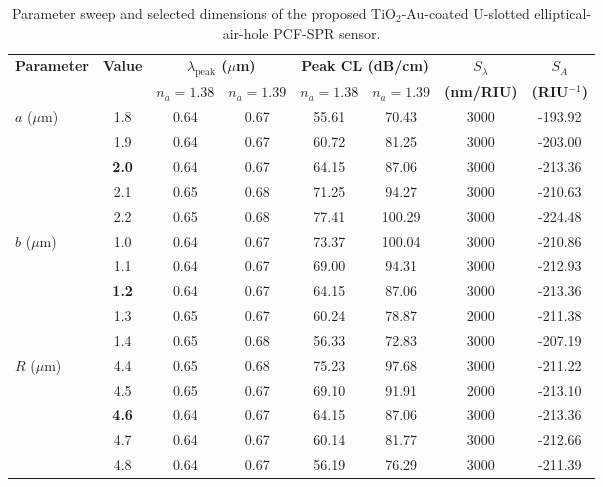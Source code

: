 \documentclass[ACS,STIX2COL]{WileyNJD-v2}
\begin{document}
\begin{table}[!t]
\centering
\caption{Parameter sweep and selected dimensions of the proposed TiO$_2$-Au-coated U-slotted elliptical-air-hole PCF-SPR sensor.}
\label{tab:optimization_results}

\renewcommand{\arraystretch}{1.25}
\setlength{\tabcolsep}{4pt}
\scriptsize
\normalfont

\begin{tabular*}{\textwidth}{@{\extracolsep{\fill}}
l c c c c c c c
@{}}

\toprule

\textbf{Parameter}
& \textbf{Value}
& \multicolumn{2}{c}{\textbf{$\lambda_{\mathrm{peak}}$ ($\mu$m)}}
& \multicolumn{2}{c}{\textbf{Peak CL (dB/cm)}}
& \textbf{$S_{\lambda}$}
& \textbf{$S_A$}
\\

\cmidrule(lr){3-4}
\cmidrule(lr){5-6}

&
& \textbf{$n_a=1.38$}
& \textbf{$n_a=1.39$}
& \textbf{$n_a=1.38$}
& \textbf{$n_a=1.39$}
& \textbf{(nm/RIU)}
& \textbf{(RIU$^{-1}$)}
\\

\midrule

\multirow{5}{*}{$a$ ($\mu$m)}
& 1.8 & 0.64 & 0.67 & 55.61 & 70.43 & 3000 & -193.92 \\
& 1.9 & 0.64 & 0.67 & 60.72 & 81.25 & 3000 & -203.00 \\
& \textbf{2.0} & 0.64 & 0.67 & 64.15 & 87.06 & 3000 & -213.36 \\
& 2.1 & 0.65 & 0.68 & 71.25 & 94.27 & 3000 & -210.63 \\
& 2.2 & 0.65 & 0.68 & 77.41 & 100.29 & 3000 & -224.48 \\

\midrule

\multirow{5}{*}{$b$ ($\mu$m)}
& 1.0 & 0.64 & 0.67 & 73.37 & 100.04 & 3000 & -210.86 \\
& 1.1 & 0.64 & 0.67 & 69.00 & 94.31 & 3000 & -212.93 \\
& \textbf{1.2} & 0.64 & 0.67 & 64.15 & 87.06 & 3000 & -213.36 \\
& 1.3 & 0.65 & 0.67 & 60.24 & 78.87 & 2000 & -211.38 \\
& 1.4 & 0.65 & 0.68 & 56.33 & 72.83 & 3000 & -207.19 \\

\midrule

\multirow{5}{*}{$R$ ($\mu$m)}
& 4.4 & 0.65 & 0.68 & 75.23 & 97.68 & 3000 & -211.22 \\
& 4.5 & 0.65 & 0.67 & 69.10 & 91.91 & 2000 & -213.10 \\
& \textbf{4.6} & 0.64 & 0.67 & 64.15 & 87.06 & 3000 & -213.36 \\
& 4.7 & 0.64 & 0.67 & 60.14 & 81.77 & 3000 & -212.66 \\
& 4.8 & 0.64 & 0.67 & 56.19 & 76.29 & 3000 & -211.39 \\


\end{tabular*}
\end{table}
\end{document}
